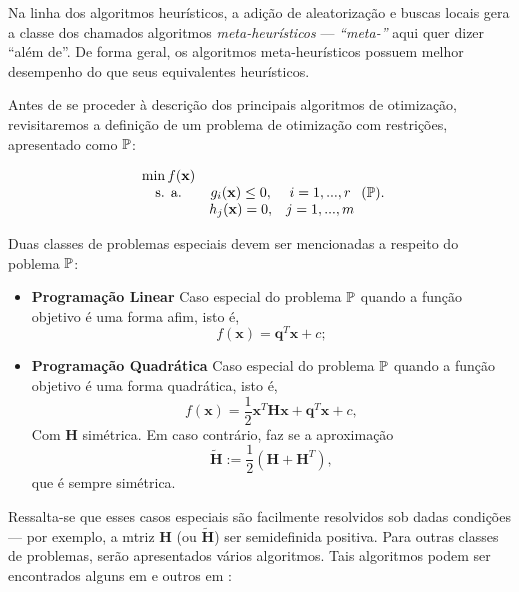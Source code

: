 Na linha dos algoritmos heur\'{i}sticos, a adi\c{c}\~{a}o de aleatoriza\c{c}\~{a}o e buscas locais gera a classe dos chamados algoritmos \textit{meta-heur\'{i}sticos} --- \textit{``meta-''} aqui quer dizer ``al\'{e}m de''. De forma geral, os algoritmos meta-heur\'{i}sticos possuem melhor desempenho do que seus equivalentes heur\'{i}sticos.

Antes de se proceder \`{a} descri\c{c}\~{a}o dos principais algoritmos de otimiza\c{c}\~{a}o, revisitaremos a defini\c{c}\~{a}o de um problema de otimiza\c{c}\~{a}o com restri\c{c}\~{o}es, apresentado como $\mathbb{P}$:

\begin{equation}
\label{compProb2}
\begin{array}{ccc}
\min f(\mathbf{x}) & &\\
\text{s. a.} & g_i (\mathbf{x}) \le 0, & i = 1,...,r\\ 
 & h_j (\mathbf{x}) = 0, & j = 1,...,m
\end{array} (\mathbb{P}).
\end{equation}

Duas classes de problemas especiais devem ser mencionadas a respeito do poblema $\mathbb{P}$:

\begin{itemize}
\item \textbf{Programa\c{c}\~{a}o Linear} Caso especial do problema $\mathbb{P}$ quando a fun\c{c}\~{a}o objetivo \'{e} uma forma afim, isto \'{e},
\begin{equation*}
f(\mathbf{x}) = \mathbf{q}^T \mathbf{x} + c;
\end{equation*}
\item \textbf{Programa\c{c}\~{a}o Quadr\'{a}tica} Caso especial do problema $\mathbb{P}$ quando a fun\c{c}\~{a}o objetivo \'{e} uma forma quadr\'{a}tica, isto \'{e},
\begin{equation*}
f(\mathbf{x}) = \frac{1}{2}\mathbf{x}^T \mathbf{Hx} + \mathbf{q}^T \mathbf{x} + c,
\end{equation*}
Com $\mathbf{H}$ sim\'{e}trica. Em caso contr\'{a}rio, faz se a aproxima\c{c}\~{a}o
\begin{equation*}
\tilde{\mathbf{H}} := \frac{1}{2} (\mathbf{H} + \mathbf{H}^T),
\end{equation*}
que \'{e} sempre sim\'{e}trica.
\end{itemize}

Ressalta-se que esses casos especiais s\~{a}o facilmente resolvidos sob dadas condi\c{c}\~{o}es --- por exemplo, a mtriz $\mathbf{H}$ (ou $\tilde{\mathbf{H}}$) ser semidefinida positiva. Para outras classes de problemas, ser\~{a}o apresentados v\'{a}rios algoritmos. Tais algoritmos podem ser encontrados alguns em \cite{guller} e outros em \cite{yang}:

